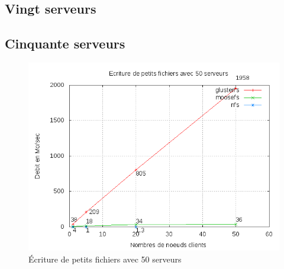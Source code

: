\documentclass[12pt]{report}
\begin{document}
			\subsection{Vingt serveurs}

			\subsection{Cinquante serveurs}


\begin{figure}[H]
\begin{center}
\includegraphics[bb=0 0 640 480,width=12cm]{images/srv50ws2.png}
\caption{Écriture de petits fichiers avec 50 serveurs}
\end{center}
\end{figure} 
\end{document}
